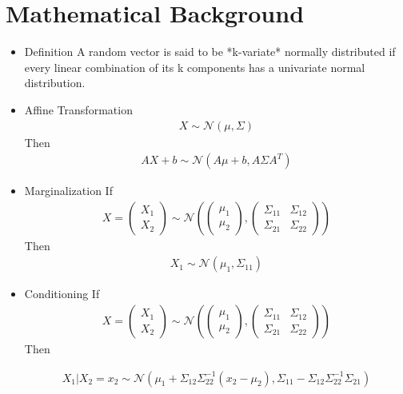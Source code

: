 \documentclass[10pt,onecolumn,letterpaper]{article}
\begin{document}
\section{Mathematical Background}
\begin{itemize}
    \item Definition
    A random vector is said to be *k-variate* normally distributed if every linear combination of its k components has a univariate normal distribution.
    \item Affine Transformation
    \begin{align}
    X \sim \mathcal{N}\left(\mu, \Sigma\right)
    \end{align}
    Then
    \begin{align}
    AX+b \sim \mathcal{N}\left(A\mu+b, A\Sigma A^T\right)
    \end{align}

    \item Marginalization
    If
    \begin{align}
    X = \begin{pmatrix} X_1 \\ X_2 \end{pmatrix} \sim \mathcal{N}
    \left(
        \begin{pmatrix}\mu_1\\\mu_2\end{pmatrix},
        \begin{pmatrix}
            \Sigma_{11} & \Sigma_{12}\\
            \Sigma_{21} & \Sigma_{22}
        \end{pmatrix}
        \right)
    \end{align}
    Then
    \begin{align}
    X_1 \sim \mathcal{N}\left( \mu_1, \Sigma_{11} \right)
    \end{align}

    \item Conditioning
    If
    \begin{align}
    X = \begin{pmatrix} X_1 \\ X_2 \end{pmatrix} \sim \mathcal{N}
    \left(
        \begin{pmatrix}\mu_1\\\mu_2\end{pmatrix},
        \begin{pmatrix}
            \Sigma_{11} & \Sigma_{12}\\
            \Sigma_{21} & \Sigma_{22}
        \end{pmatrix}
        \right)
    \end{align}
    Then

    \begin{align}
        X_1 | X_2=x_2 \sim \mathcal{N}\left(\mu_1 + \Sigma_{12}\Sigma_{22}^{-1}(x_2-\mu_2),\right.
        \left.\Sigma_{11} - \Sigma_{12}\Sigma_{22}^{-1}\Sigma_{21}\right)
    \end{align}
\end{itemize}
\end{document}
